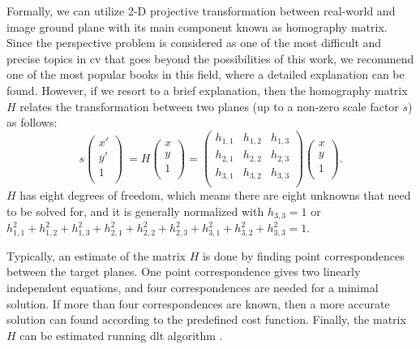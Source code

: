             Formally, we can utilize 2-D projective transformation between real-world and image ground plane with its main component known as homography matrix. Since the perspective problem is considered as one of the most difficult and precise topics in \gls{cv} that goes beyond the possibilities of this work, we recommend one of the most popular books \cite{hartley2003multiple} in this field, where a detailed explanation can be found. However, if we resort to a brief explanation, then the homography matrix $H$ relates the transformation between two planes (up to a non-zero scale factor $s$) as follows:
            \begin{equation}
                s 
                \begin{pmatrix}
                    x' \\ y' \\ 1 \\
                \end{pmatrix}\
                = H
                \begin{pmatrix}
                    x \\
                    y \\
                    1 \\
                \end{pmatrix}
                =
                \begin{pmatrix}
                    h_{1,1} & h_{1,2} & h_{1,3} \\ h_{2,1} & h_{2,2} & h_{2,3} \\ h_{3,1} & h_{3,2} & h_{3,3} \\
                \end{pmatrix}
                \begin{pmatrix}
                    x \\ y \\ 1 \\
                \end{pmatrix}.
            \end{equation}
            $H$ has eight degrees of freedom, which means there are eight unknowns that need to be solved for, and it is generally normalized with $h_{3,3} = 1$ or $h_{1,1}^2 + h_{1,2}^2 + h_{1,3}^2 + h_{2,1}^2 + h_{2,2}^2 + h_{2,3}^2 + h_{3,1}^2 + h_{3,2}^2 + h_{3,3}^2 = 1$.

            Typically, an estimate of the matrix $H$ is done by finding point correspondences between the target planes. One point correspondence gives two linearly independent equations, and four correspondences are needed for a minimal solution. If more than four correspondences are known, then a more accurate solution can found according to the predefined cost function. Finally, the matrix $H$ can be estimated running \gls{dlt} algorithm \cite{hartley2003multiple}.


